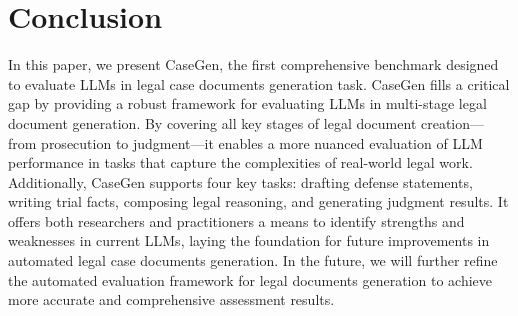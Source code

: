 \section{Conclusion}


In this paper, we present CaseGen, the first comprehensive benchmark designed to evaluate LLMs in legal case documents generation task. 
CaseGen fills a critical gap by providing a robust framework for evaluating LLMs in multi-stage legal document generation.
By covering all key stages of legal document creation—from prosecution to judgment—it enables a more nuanced evaluation of LLM performance in tasks that capture the complexities of real-world legal work.
Additionally, CaseGen supports four key tasks: drafting defense statements, writing trial facts, composing legal reasoning, and generating judgment results. It offers both researchers and practitioners a means to identify strengths and weaknesses in current LLMs, laying the foundation for future improvements in automated legal case documents generation.
In the future, we will further refine the automated evaluation framework for legal documents generation to achieve more accurate and comprehensive assessment results.